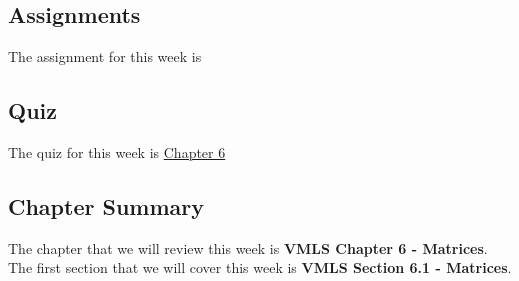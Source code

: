 \subsection{Assignments}

The assignment for this week is   

\subsection{Quiz}

The quiz for this week is \href{https://applied.cs.colorado.edu/mod/quiz/view.php?id=50739}{Chapter 6} \textbullet {}  

\subsection{Chapter Summary}

The chapter that we will review this week is \textbf{VMLS Chapter 6 - Matrices}. The first section that we will cover this week is \textbf{VMLS Section 6.1 - Matrices}.

